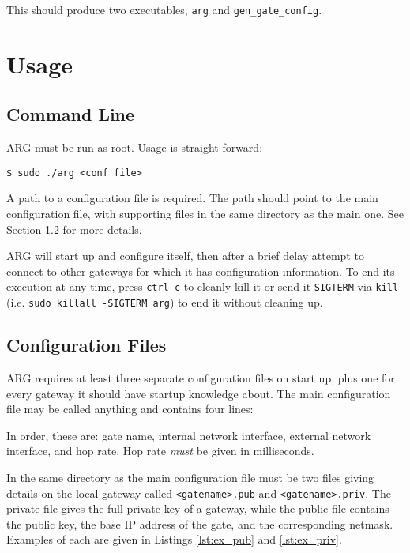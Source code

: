 \par This should produce two executables, \texttt{arg} and \texttt{gen\_gate\_config}.

\section{Usage}
\label{sec:arg_cmd}
\subsection{Command Line}
\par \ac{ARG} must be run as root. Usage is straight forward:
\begin{lstlisting}[numbers=none] 
$ sudo ./arg <conf file>
\end{lstlisting}

\par A path to a configuration file is required. The path should point to the main configuration file, with supporting files in the same directory as the main one. See Section \ref{sec:arg_conf_files} for more details.

\par \ac{ARG} will start up and configure itself, then after a brief delay attempt to connect to other gateways for which it has configuration information. To end its execution at any time, press \texttt{ctrl-c} to cleanly kill it or send it \texttt{SIGTERM} via \texttt{kill} (i.e. \lstinline{sudo killall -SIGTERM arg}) to end it without cleaning up.

\subsection{Configuration Files}
\label{sec:arg_conf_files}
\par \ac{ARG} requires at least three separate configuration files on start up, plus one for every gateway it should have startup knowledge about. The main configuration file may be called anything and contains four lines:


\par In order, these are: gate name, internal network interface, external network interface, and hop rate. Hop rate \textit{must} be given in milliseconds.

\par In the same directory as the main configuration file must be two files giving details on the local gateway called \texttt{<gatename>.pub} and \texttt{<gatename>.priv}. The private file gives the full private key of a gateway, while the public file contains the public key, the base \ac{IP} address of the gate, and the corresponding netmask. Examples of each are given in Listings \ref{lst:ex_pub} and \ref{lst:ex_priv}.



